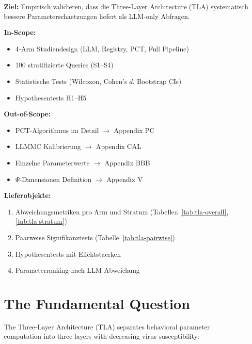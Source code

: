 \begin{tcolorbox}[colback=white, colframe=fadarkblue, title=Appendix Scope]
\textbf{Ziel:} Empirisch validieren, dass die Three-Layer Architecture (TLA)
systematisch bessere Parameterschaetzungen liefert als LLM-only Abfragen.

\textbf{In-Scope:}
\begin{itemize}
  \item 4-Arm Studiendesign (LLM, Registry, PCT, Full Pipeline)
  \item 100 stratifizierte Queries (S1--S4)
  \item Statistische Tests (Wilcoxon, Cohen's $d$, Bootstrap CIs)
  \item Hypothesentests H1--H5
\end{itemize}

\textbf{Out-of-Scope:}
\begin{itemize}
  \item PCT-Algorithmus im Detail $\to$ Appendix PC
  \item LLMMC Kalibrierung $\to$ Appendix CAL
  \item Einzelne Parameterwerte $\to$ Appendix BBB
  \item $\Psi$-Dimensionen Definition $\to$ Appendix V
\end{itemize}

\textbf{Lieferobjekte:}
\begin{enumerate}
  \item Abweichungsmetriken pro Arm und Stratum (Tabellen~\ref{tab:tla-overall}, \ref{tab:tla-stratum})
  \item Paarweise Signifikanztests (Tabelle~\ref{tab:tla-pairwise})
  \item Hypothesentests mit Effektstaerken
  \item Parameterranking nach LLM-Abweichung
\end{enumerate}
\end{tcolorbox}



\section{The Fundamental Question}
\label{sec:lb-motivation}

The Three-Layer Architecture (TLA) separates behavioral parameter computation
into three layers with decreasing virus susceptibility:


